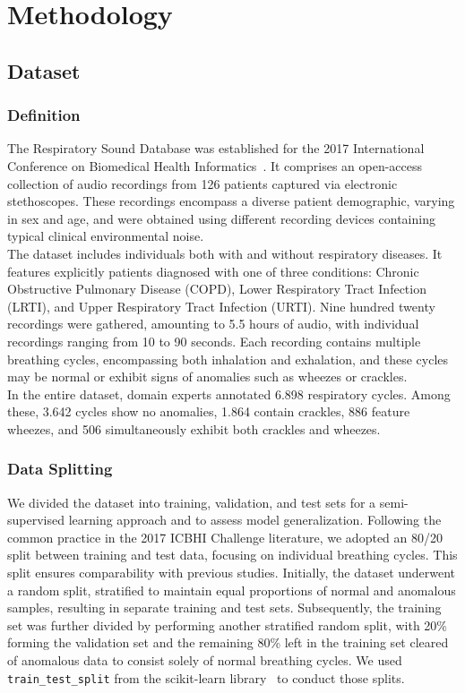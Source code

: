 \cleardoubleoddpage%
\chapter{Methodology}

\section{Dataset}
\subsection{Definition}
The Respiratory Sound Database was established for the 2017 International Conference on Biomedical Health Informatics~\cite{rocha2018alpha}. It comprises an open-access collection of audio recordings from 126 patients captured via electronic stethoscopes. These recordings encompass a diverse patient demographic, varying in sex and age, and were obtained using different recording devices containing typical clinical environmental noise.\\
The dataset includes individuals both with and without respiratory diseases. It features explicitly patients diagnosed with one of three conditions: Chronic Obstructive Pulmonary Disease (COPD), Lower Respiratory Tract Infection (LRTI), and Upper Respiratory Tract Infection (URTI). Nine hundred twenty recordings were gathered, amounting to 5.5 hours of audio, with individual recordings ranging from 10 to 90 seconds. Each recording contains multiple breathing cycles, encompassing both inhalation and exhalation, and these cycles may be normal or exhibit signs of anomalies such as wheezes or crackles.\\
In the entire dataset, domain experts annotated 6.898 respiratory cycles. Among these, 3.642 cycles show no anomalies, 1.864 contain crackles, 886 feature wheezes, and 506 simultaneously exhibit both crackles and wheezes.

\subsection{Data Splitting}
\label{method:data-splitting}
We divided the dataset into training, validation, and test sets for a semi-supervised learning approach and to assess model generalization. Following the common practice in the 2017 ICBHI Challenge literature, we adopted an 80/20 split between training and test data, focusing on individual breathing cycles. This split ensures comparability with previous studies.
Initially, the dataset underwent a random split, stratified to maintain equal proportions of normal and anomalous samples, resulting in separate training and test sets. Subsequently, the training set was further divided by performing another stratified random split, with 20\% forming the validation set and the remaining 80\% left in the training set cleared of anomalous data to consist solely of normal breathing cycles. We used \lstinline{train_test_split} from the scikit-learn library~\cite{pedregosa2011scikit} to conduct those splits.\\

